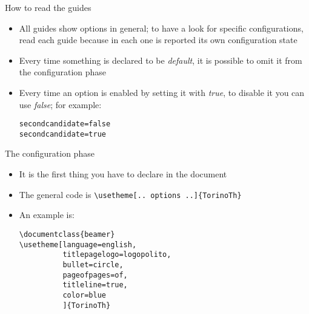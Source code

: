 \begin{frame}[t,fragile]{How to read the guides}
\begin{itemize}
\item All guides show options in general; to have a look for specific configurations, read each guide because in each one is reported its own configuration state
\item Every time something is declared to be \emph{default}, it is possible to omit it from the configuration phase
\item Every time an option is enabled by setting it with \emph{true}, to disable it you can use \emph{false}; for example:
\begin{verbatim}
secondcandidate=false 
secondcandidate=true 
\end{verbatim}
\end{itemize}
\end{frame}

\begin{frame}[t,fragile]{The configuration phase}
\begin{itemize}
\item It is the first thing you have to declare in the document
\item The general code is \verb!\usetheme[.. options ..]{TorinoTh}!
\item An example is:
\begin{verbatim}
\documentclass{beamer}
\usetheme[language=english,
          titlepagelogo=logopolito,
          bullet=circle,
          pageofpages=of,
          titleline=true,
          color=blue
          ]{TorinoTh}
\end{verbatim}
\end{itemize}
\end{frame}

